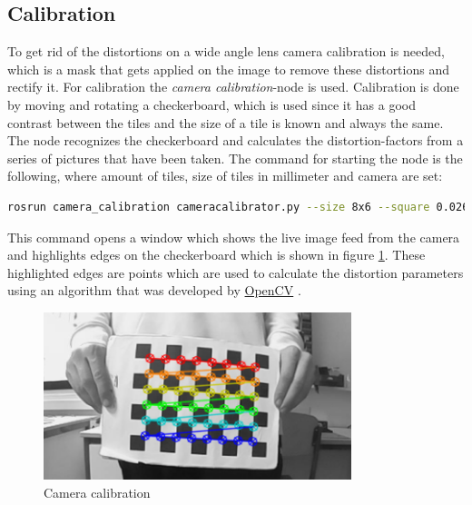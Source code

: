 \subsection{Calibration}
To get rid of the distortions on a wide angle lens camera calibration is needed, which is a mask that gets applied on the image to remove these distortions and rectify it.
For calibration the \textit{camera calibration}-node is used.  Calibration is done by moving and rotating a checkerboard, which is used since it has a good contrast between the tiles and the size of a tile is known and always the same. The node recognizes the checkerboard and calculates the distortion-factors from a series of pictures that have been taken.\newline
The command for starting the node is the following, where amount of tiles, size of tiles in millimeter and camera are set:\newline
\begin{lstlisting}[language=BASH,caption={Start Calibration Node}]
rosrun camera_calibration cameracalibrator.py --size 8x6 --square 0.026 --no-service-check image:=/camera/image_raw camera:=/camera
\end{lstlisting}

This command opens a window which shows the live image feed from the camera and highlights edges on the checkerboard which is shown in figure \ref{img:cameracalibration}. These highlighted edges are points which are used to calculate the distortion parameters using an algorithm that was developed by \href{https://docs.opencv.org/2.4/doc/tutorials/calib3d/camera_calibration/camera_calibration.html}{OpenCV} \cite{cameracalibrationopencv}.\newline
\begin{figure}[h]
	\centering
	\includegraphics[width=0.8\textwidth]{./media/images/CameraCalibration.png}
  	\caption{Camera calibration}
  	\label{img:cameracalibration}
\end{figure} \newline

